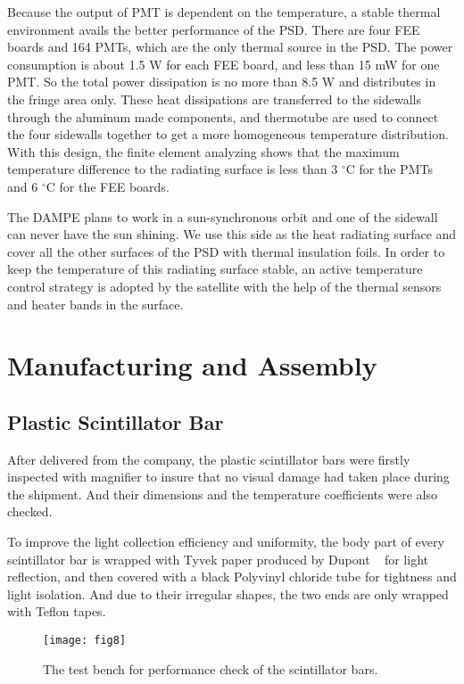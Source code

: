 \documentclass[preprint]{elsarticle}
\begin{document}
Because the output of PMT is dependent on the temperature, a stable thermal environment avails the better performance of the PSD. There are four FEE boards and 164 PMTs, which are the only thermal source in the PSD. The power consumption is about 1.5 W for each FEE board, and less than 15 mW for one PMT. So the total power dissipation is no more than 8.5 W and distributes in the fringe area only. These heat dissipations are transferred to the sidewalls through the aluminum made components, and thermotube are used to connect the four sidewalls together to get a more homogeneous temperature distribution. With this design, the finite element analyzing shows that the maximum temperature difference to the radiating surface is less than 3 $^{\circ}$C for the PMTs and 6 $^{\circ}$C for the FEE boards.

The DAMPE plans to work in a sun-synchronous orbit and one of the sidewall can never have the sun shining. We use this side as the heat radiating surface and cover all the other surfaces of the PSD with thermal insulation foils. In order to keep the temperature of this radiating surface stable, an active temperature control strategy is adopted by the satellite with the help of the thermal sensors and heater bands in the surface.

\section{Manufacturing and Assembly}

\subsection{Plastic Scintillator Bar}

After delivered from the company, the plastic scintillator bars were firstly inspected with magnifier to insure that no visual damage had taken place during the shipment. And their dimensions and the temperature coefficients were also checked.

To improve the light collection efficiency and uniformity, the body part of every scintillator bar is wrapped with Tyvek paper produced by Dupont ~\cite{tyvek} for light reflection, and then covered with a black Polyvinyl chloride tube for tightness and light isolation. And due to their irregular shapes, the two ends are only wrapped with Teflon tapes.

\begin{figure}
 \centering
 \texttt{[image: fig8]}
\caption{The test bench for performance check of the scintillator bars. }
\label{fig:fig8}
\end{figure}
\end{document}
